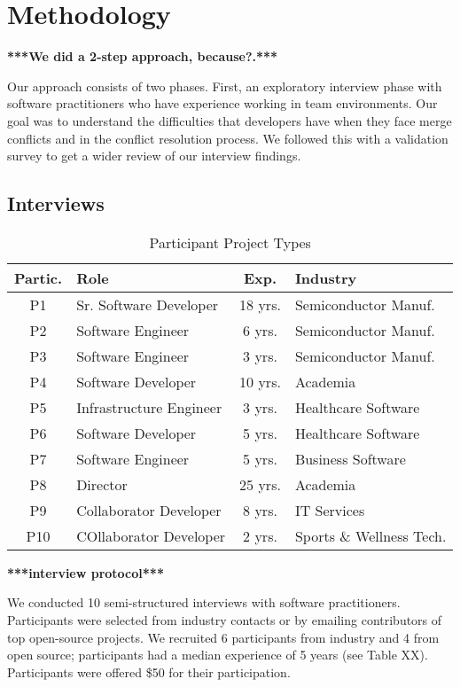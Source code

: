 \section{Methodology}\label{methodology}
\textbf{***We did a 2-step approach, because?.***}

Our approach consists of two phases. First, an exploratory interview phase with software practitioners who have experience working in team environments. Our goal was to understand the difficulties that developers have when they face merge conflicts and in the conflict resolution process. We followed this with a validation survey to get a wider review of our interview findings. 

\subsection{Interviews}
\begin{table}[!t]
\renewcommand{\arraystretch}{1.3}
\caption{Participant Project Types}
\label{project_type}
\centering
\begin{tabular}{|c|l|c|l|}
	\hline
	Partic. & Role & Exp. & Industry \\
	\hline
	P1 & Sr. Software Developer & 18 yrs. & Semiconductor Manuf.\\
	P2 & Software Engineer & 6 yrs. & Semiconductor Manuf.\\
	P3 & Software Engineer & 3 yrs. & Semiconductor Manuf.\\
	P4 & Software Developer & 10 yrs. & Academia\\
	P5 & Infrastructure Engineer & 3 yrs. & Healthcare Software\\
	P6 & Software Developer & 5 yrs. & Healthcare Software\\
	P7 & Software Engineer & 5 yrs. & Business Software\\
	P8 & Director & 25 yrs. & Academia\\
	P9 & Collaborator Developer & 8 yrs. & IT Services\\
	P10 & COllaborator Developer & 2 yrs. & Sports \& Wellness Tech.\\
	\hline
\end{tabular}
\end{table}

\textbf{***interview protocol***}

We conducted 10 semi-structured interviews with software practitioners. Participants were selected from industry contacts or by emailing contributors of top open-source projects. We recruited 6 participants from industry and 4 from open source; participants had a median experience of 5 years (see Table XX). Participants were offered \$50 for their participation.  

